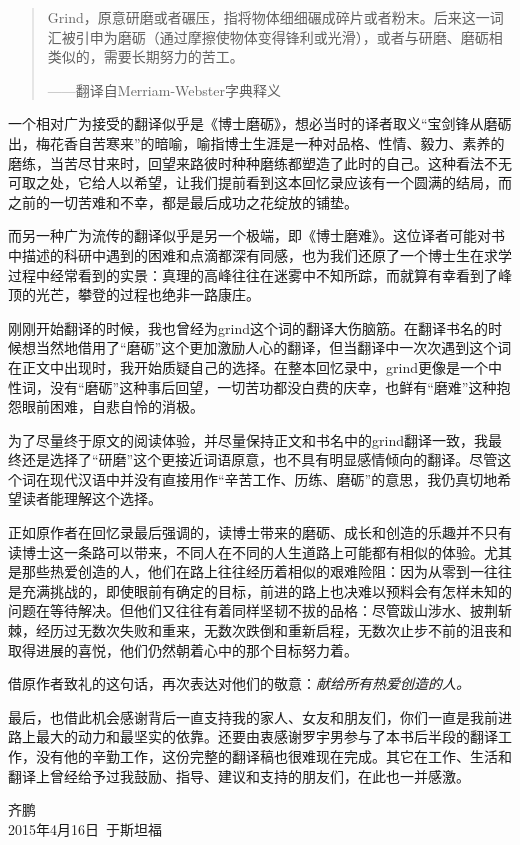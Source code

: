 \documentclass[12pt,UTF8,nofonts]{book}
\begin{document}
\begin{quote}
Grind，原意研磨或者碾压，指将物体细细碾成碎片或者粉末。后来这一词汇被引申为磨砺（通过摩擦使物体变得锋利或光滑），或者与研磨、磨砺相类似的，需要长期努力的苦工。

——翻译自Merriam-Webster字典释义
\end{quote}

一个相对广为接受的翻译似乎是《博士磨砺》，想必当时的译者取义“宝剑锋从磨砺出，梅花香自苦寒来”的暗喻，喻指博士生涯是一种对品格、性情、毅力、素养的磨练，当苦尽甘来时，回望来路彼时种种磨练都塑造了此时的自己。这种看法不无可取之处，它给人以希望，让我们提前看到这本回忆录应该有一个圆满的结局，而之前的一切苦难和不幸，都是最后成功之花绽放的铺垫。

而另一种广为流传的翻译似乎是另一个极端，即《博士磨难》。这位译者可能对书中描述的科研中遇到的困难和点滴都深有同感，也为我们还原了一个博士生在求学过程中经常看到的实景：真理的高峰往往在迷雾中不知所踪，而就算有幸看到了峰顶的光芒，攀登的过程也绝非一路康庄。

刚刚开始翻译的时候，我也曾经为grind这个词的翻译大伤脑筋。在翻译书名的时候想当然地借用了“磨砺”这个更加激励人心的翻译，但当翻译中一次次遇到这个词在正文中出现时，我开始质疑自己的选择。在整本回忆录中，grind更像是一个中性词，没有“磨砺”这种事后回望，一切苦功都没白费的庆幸，也鲜有“磨难”这种抱怨眼前困难，自悲自怜的消极。

为了尽量终于原文的阅读体验，并尽量保持正文和书名中的grind翻译一致，我最终还是选择了“研磨”这个更接近词语原意，也不具有明显感情倾向的翻译。尽管这个词在现代汉语中并没有直接用作“辛苦工作、历练、磨砺”的意思，我仍真切地希望读者能理解这个选择。


正如原作者在回忆录最后强调的，读博士带来的磨砺、成长和创造的乐趣并不只有读博士这一条路可以带来，不同人在不同的人生道路上可能都有相似的体验。尤其是那些热爱创造的人，他们在路上往往经历着相似的艰难险阻：因为从零到一往往是充满挑战的，即使眼前有确定的目标，前进的路上也决难以预料会有怎样未知的问题在等待解决。但他们又往往有着同样坚韧不拔的品格：尽管跋山涉水、披荆斩棘，经历过无数次失败和重来，无数次跌倒和重新启程，无数次止步不前的沮丧和取得进展的喜悦，他们仍然朝着心中的那个目标努力着。

借原作者致礼的这句话，再次表达对他们的敬意：\emph{献给所有热爱创造的人。}

最后，也借此机会感谢背后一直支持我的家人、女友和朋友们，你们一直是我前进路上最大的动力和最坚实的依靠。还要由衷感谢罗宇男参与了本书后半段的翻译工作，没有他的辛勤工作，这份完整的翻译稿也很难现在完成。其它在工作、生活和翻译上曾经给予过我鼓励、指导、建议和支持的朋友们，在此也一并感激。
\\[3em]
\begin{flushright}
齐鹏\\
2015年4月16日\ 于斯坦福
\end{flushright}
\end{document}
